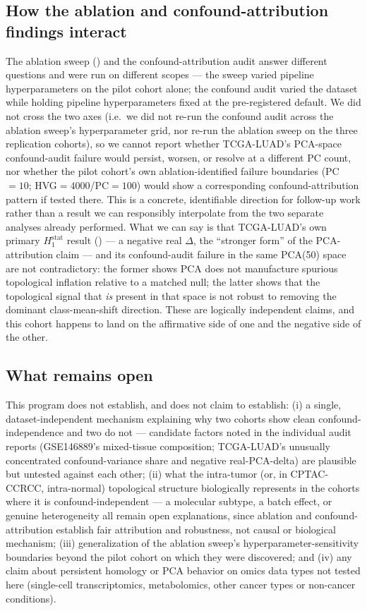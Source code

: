 \subsection{How the ablation and confound-attribution findings interact}

The ablation sweep () and the confound-attribution audit answer different questions and
were run on different scopes --- the sweep varied pipeline hyperparameters on the pilot cohort alone; the
confound audit varied the dataset while holding pipeline hyperparameters fixed at the pre-registered
default. We did not cross the two axes (i.e.\ we did not re-run the confound audit across the ablation
sweep's hyperparameter grid, nor re-run the ablation sweep on the three replication cohorts), so we cannot
report whether TCGA-LUAD's PCA-space confound-audit failure would persist, worsen, or resolve at a
different PC count, nor whether the pilot cohort's own ablation-identified failure boundaries (PC$=10$;
HVG$=4000$/PC$=100$) would show a corresponding confound-attribution pattern if tested there. This is a
concrete, identifiable direction for follow-up work rather than a result we can responsibly interpolate
from the two separate analyses already performed. What we can say is that TCGA-LUAD's own primary
$H_1^{\text{stat}}$ result () --- a negative real $\Delta$, the ``stronger form''
of the PCA-attribution claim --- and its confound-audit failure in the same PCA(50) space are not
contradictory: the former shows PCA does not manufacture spurious topological inflation relative to a
matched null; the latter shows that the topological signal that \emph{is} present in that space is not
robust to removing the dominant class-mean-shift direction. These are logically independent claims, and
this cohort happens to land on the affirmative side of one and the negative side of the other.

\subsection{What remains open}

This program does not establish, and does not claim to establish: (i) a single, dataset-independent
mechanism explaining why two cohorts show clean confound-independence and two do not --- candidate factors
noted in the individual audit reports (GSE146889's mixed-tissue composition; TCGA-LUAD's unusually
concentrated confound-variance share and negative real-PCA-delta) are plausible but untested against each
other; (ii) what the intra-tumor (or, in CPTAC-CCRCC, intra-normal) topological structure biologically
represents in the cohorts where it is confound-independent --- a molecular subtype, a batch effect, or
genuine heterogeneity all remain open explanations, since ablation and confound-attribution establish fair
attribution and robustness, not causal or biological mechanism; (iii) generalization of the ablation sweep's
hyperparameter-sensitivity boundaries beyond the pilot cohort on which they were discovered; and (iv) any
claim about persistent homology or PCA behavior on omics data types not tested here (single-cell
transcriptomics, metabolomics, other cancer types or non-cancer conditions).

